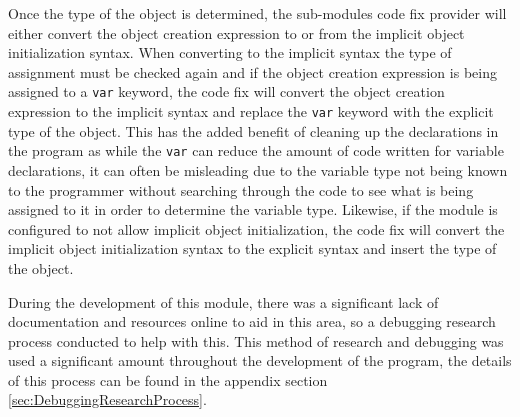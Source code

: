 Once the type of the object is determined, the sub-modules code fix provider will either convert the object creation expression to or from the implicit object initialization syntax. When converting to the implicit syntax the type of assignment must be checked again and if the object creation expression is being assigned to a \texttt{var} keyword, the code fix will convert the object creation expression to the implicit syntax and replace the \texttt{var} keyword with the explicit type of the object. This has the added benefit of cleaning up the declarations in the program as while the \texttt{var} can reduce the amount of code written for variable declarations, it can often be misleading due to the variable type not being known to the programmer without searching through the code to see what is being assigned to it in order to determine the variable type. Likewise, if the module is configured to not allow implicit object initialization, the code fix will convert the implicit object initialization syntax to the explicit syntax and insert the type of the object.

During the development of this module, there was a significant lack of documentation and resources online to aid in this area, so a debugging research process conducted to help with this. This method of research and debugging was used a significant amount throughout the development of the program, the details of this process can be found in the appendix section \ref{sec:DebuggingResearchProcess}.
